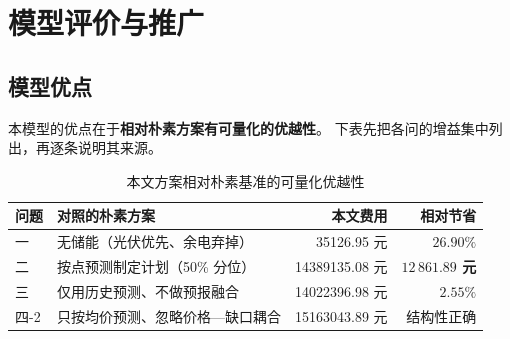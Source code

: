 \section{模型评价与推广}

\subsection{模型优点}

本模型的优点在于\textbf{相对朴素方案有可量化的优越性}。
下表先把各问的增益集中列出，再逐条说明其来源。

\begin{table}[htbp]
\centering
\caption{本文方案相对朴素基准的可量化优越性}
\label{tab:merits}
\small
\setlength{\tabcolsep}{4pt}
\begin{tabularx}{\textwidth}{@{}l X r r@{}}
\toprule
问题 & 对照的朴素方案 & {本文费用} & {相对节省} \\
\midrule
一 & 无储能（光伏优先、余电弃掉） & 35126.95 元 & \textbf{$26.90\%$} \\
二 & 按点预测制定计划（50\% 分位） & 14389135.08 元 & \textbf{$12\,861.89$ 元} \\
三 & 仅用历史预测、不做预报融合 & 14022396.98 元 & \textbf{$2.55\%$} \\
四-2 & 只按均价预测、忽略价格—缺口耦合 & 15163043.89 元 & 结构性正确 \\
\bottomrule
\end{tabularx}
\end{table}

